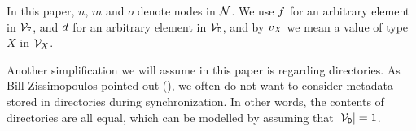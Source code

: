 In this paper, $n$, $m$ and $o$ denote nodes in $\mathcal{N}$.
We use $f$ for an arbitrary element in $\mathcal{V}_{\mathtt{F}}$, 
and $d$ for an arbitrary element in $\mathcal{V}_{\mathtt{D}}$,
and by $v_X$ we mean a value of type $X$ in $\mathcal{V}_{X}$.


Another simplification we will assume in this paper is regarding directories.
As Bill Zissimopoulos pointed out (\cite{BZ}), we often do not want to consider metadata stored in
directories during synchronization. In other words, the contents of directories are all equal,
which can be modelled by assuming that $|\mathcal{V}_{\mathtt{D}}|=1$.
